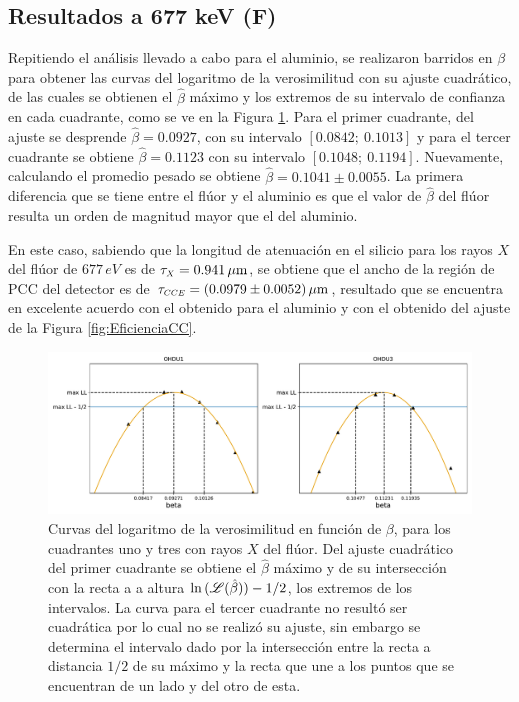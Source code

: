 \subsection{Resultados a 677 keV (F)}
\noindent Repitiendo el análisis llevado a cabo para el aluminio, se realizaron barridos en $\beta$ para obtener las curvas del logaritmo de la verosimilitud con su ajuste cuadrático, de las cuales se obtienen el $\hat{\beta}$ máximo y los extremos de su intervalo de confianza en cada cuadrante, como se ve en la Figura \ref{fig:F_barridos_beta}. Para el primer cuadrante, del ajuste se desprende $\hat{\beta} = 0.0927 $, con su intervalo $[0.0842;\ 0.1013]$ y para el tercer cuadrante se obtiene $\hat{\beta} = 0.1123 $ con su intervalo $[0.1048;\ 0.1194]$. Nuevamente, calculando el promedio pesado se obtiene $\hat{\beta} = 0.1041 \pm 0.0055 $. La primera diferencia que se tiene entre el flúor y el aluminio es que el valor de $\hat{\beta}$ del flúor resulta un orden de magnitud mayor que el del aluminio.

En este caso, sabiendo que la longitud de atenuación en el silicio para los rayos $X$ del flúor de $677\,\si{eV}$ es de $\tau_{\scaleto{X}{4pt}} = 0.941\,\si{\mu m}$\cite{AttenuationLength}, se obtiene que el ancho de la región de PCC del detector es de $\tau_{\scaleto{CCE}{4pt}} = (0.0979 \pm 0.0052)\,\si{\mu m}$, resultado que se encuentra en excelente acuerdo con el obtenido para el aluminio y con el obtenido del ajuste de la Figura \ref{fig:EficienciaCC}\cite{PCC-CCE-interno}.

\begin{figure}[h]
    \centering
    \includegraphics[scale=0.5]{Figs/F_barridos_beta.pdf}
    \caption{Curvas del logaritmo de la verosimilitud en función de $\beta$, para los cuadrantes uno y tres con rayos $X$ del flúor. Del ajuste cuadrático del primer cuadrante se obtiene el $\hat{\beta}$ máximo y de su intersección con la recta a a altura $\ln{(\mathscr{L}(\hat{\beta}))} - 1/2$, los extremos de los intervalos. La curva para el tercer cuadrante no resultó ser cuadrática por lo cual no se realizó su ajuste, sin embargo se determina el intervalo dado por la intersección entre la recta a distancia $1/2$ de su máximo y la recta que une a los puntos que se encuentran de un lado y del otro de esta.}
    \label{fig:F_barridos_beta}
\end{figure}

